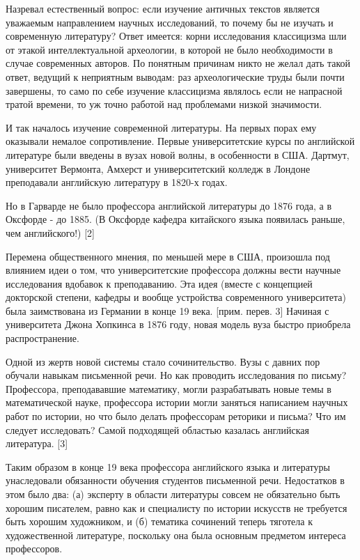 \documentclass[ebook,12pt,oneside,openany]{memoir}
\begin{document}
Назревал естественный вопрос: если изучение античных текстов является
уважаемым направлением научных исследований, то почему бы не изучать и
современную литературу? Ответ имеется: корни исследования классицизма
шли от этакой интеллектуальной археологии, в которой не было
необходимости в случае современных авторов. По понятным причинам никто
не желал дать такой ответ, ведущий к неприятным выводам: раз
археологические труды были почти завершены, то само по себе изучение
классицизма являлось если не напрасной тратой времени, то уж точно
работой над проблемами низкой значимости. \newline

И так началось изучение современной литературы. На первых порах ему
оказывали немалое сопротивление. Первые университетские курсы по
английской литературе были введены в вузах новой волны, в особенности
в США. Дартмут, университет Вермонта, Амхерст и университетский
колледж в Лондоне преподавали английскую литературу в 1820-х годах.
\newline

Но в Гарварде не было профессора английской литературы до 1876 года, а
в Оксфорде - до 1885. (В Оксфорде кафедра китайского языка появилась
раньше, чем английского!) [2] \newline

Перемена общественного мнения, по меньшей мере в США, произошла под
влиянием идеи о том, что университетские профессора должны вести
научные исследования вдобавок к преподаванию. Эта идея (вместе с
концепцией докторской степени, кафедры и вообще устройства
современного университета) была заимствована из Германии в конце 19
века. [прим. перев. 3] Начиная с университета Джона Хопкинса в 1876
году, новая модель вуза быстро приобрела распространение. \newline

Одной из жертв новой системы стало сочинительство. Вузы с давних пор
обучали навыкам письменной речи. Но как проводить исследования по
письму? Профессора, преподававшие математику, могли разрабатывать
новые темы в математической науке, профессора истории могли заняться
написанием научных работ по истории, но что было делать профессорам
реторики и письма? Что им следует исследовать? Самой подходящей
областью казалась английская литература. [3] \newline

Таким образом в конце 19 века профессора английского языка и
литературы унаследовали обязанности обучения студентов письменной
речи. Недостатков в этом было два: (а) эксперту в области литературы
совсем не обязательно быть хорошим писателем, равно как и специалисту
по истории искусств не требуется быть хорошим художником, и (б)
тематика сочинений теперь тяготела к художественной литературе,
поскольку она была основным предметом интереса профессоров. \newline
\end{document}
